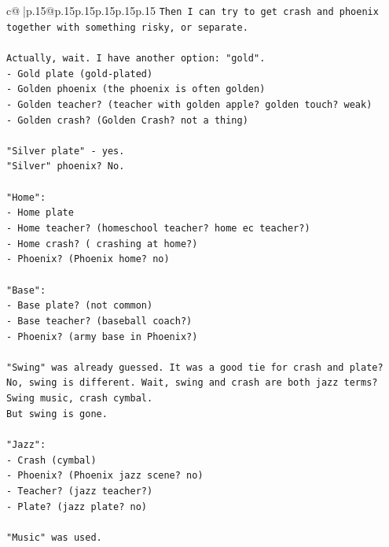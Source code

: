 \documentclass{article}
\begin{document}
{\begin{supertabular}{c@{$\;$}|p{.15\linewidth}@{}p{.15\linewidth}p{.15\linewidth}p{.15\linewidth}p{.15\linewidth}p{.15\linewidth}}
{{{\texttt{Then I can try to get crash and phoenix together with something risky, or separate.} \\
\\ 
\texttt{Actually, wait. I have another option: "gold".} \\
\texttt{{-} Gold plate (gold{-}plated)} \\
\texttt{{-} Golden phoenix (the phoenix is often golden)} \\
\texttt{{-} Golden teacher? (teacher with golden apple? golden touch? weak)} \\
\texttt{{-} Golden crash? (Golden Crash? not a thing)} \\
\\ 
\texttt{"Silver plate" {-} yes.} \\
\texttt{"Silver" phoenix? No.} \\
\\ 
\texttt{"Home":} \\
\texttt{{-} Home plate} \\
\texttt{{-} Home teacher? (homeschool teacher? home ec teacher?)} \\
\texttt{{-} Home crash? ( crashing at home?)} \\
\texttt{{-} Phoenix? (Phoenix home? no)} \\
\\ 
\texttt{"Base":} \\
\texttt{{-} Base plate? (not common)} \\
\texttt{{-} Base teacher? (baseball coach?)} \\
\texttt{{-} Phoenix? (army base in Phoenix?)} \\
\\ 
\texttt{"Swing" was already guessed. It was a good tie for crash and plate? No, swing is different. Wait, swing and crash are both jazz terms? Swing music, crash cymbal.} \\
\texttt{But swing is gone.} \\
\\ 
\texttt{"Jazz":} \\
\texttt{{-} Crash (cymbal)} \\
\texttt{{-} Phoenix? (Phoenix jazz scene? no)} \\
\texttt{{-} Teacher? (jazz teacher?)} \\
\texttt{{-} Plate? (jazz plate? no)} \\
\\ 
\texttt{"Music" was used.} \\
\\ 
}}}
\end{supertabular}}
\end{document}
